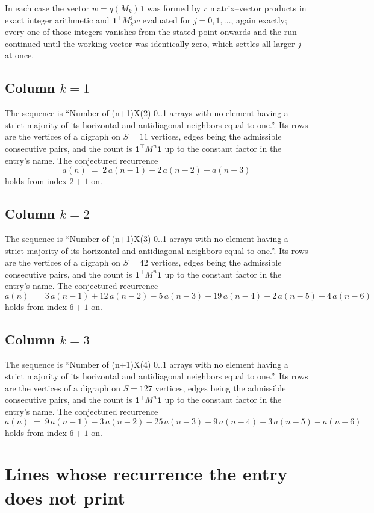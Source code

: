 \documentclass[11pt,a4paper]{article}
\theoremstyle{plain}
\theoremstyle{definition}
\begin{document}
In each case the vector $w=q(M_k)\mathbf{1}$ was formed by $r$ matrix--vector products in
exact integer arithmetic and $\mathbf{1}^{\!\top}M_k^{j}w$ evaluated for $j=0,1,\dots$,
again exactly; every one of those integers vanishes from the stated point onwards and the run
continued until the working vector was identically zero, which settles all larger $j$ at once.

\subsection*{Column $k$$=1$}
The sequence is ``Number of (n+1)X(2) 0..1 arrays with no element having a strict majority of its horizontal and antidiagonal neighbors equal to one.''. Its rows are the vertices of a digraph on
$S=11$ vertices, edges being the admissible consecutive pairs, and the count is
$\mathbf{1}^{\!\top}M^{n}\mathbf{1}$ up to the constant factor in the entry's name.
The conjectured recurrence
\[
a(n)\;=\;2\,a(n-1) + 2\,a(n-2) - a(n-3)
\]
holds from index $2+1$ on.

\subsection*{Column $k$$=2$}
The sequence is ``Number of (n+1)X(3) 0..1 arrays with no element having a strict majority of its horizontal and antidiagonal neighbors equal to one.''. Its rows are the vertices of a digraph on
$S=42$ vertices, edges being the admissible consecutive pairs, and the count is
$\mathbf{1}^{\!\top}M^{n}\mathbf{1}$ up to the constant factor in the entry's name.
The conjectured recurrence
\[
a(n)\;=\;3\,a(n-1) + 12\,a(n-2) - 5\,a(n-3) - 19\,a(n-4) + 2\,a(n-5) + 4\,a(n-6)
\]
holds from index $6+1$ on.

\subsection*{Column $k$$=3$}
The sequence is ``Number of (n+1)X(4) 0..1 arrays with no element having a strict majority of its horizontal and antidiagonal neighbors equal to one.''. Its rows are the vertices of a digraph on
$S=127$ vertices, edges being the admissible consecutive pairs, and the count is
$\mathbf{1}^{\!\top}M^{n}\mathbf{1}$ up to the constant factor in the entry's name.
The conjectured recurrence
\[
a(n)\;=\;9\,a(n-1) - 3\,a(n-2) - 25\,a(n-3) + 9\,a(n-4) + 3\,a(n-5) - a(n-6)
\]
holds from index $6+1$ on.


\section{Lines whose recurrence the entry does not print}
\end{document}
